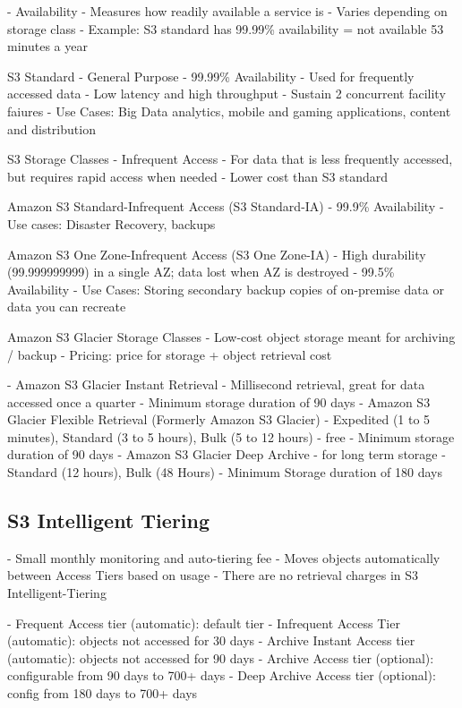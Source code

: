 \documentclass[11pt]{book}
\begin{document}
    - Availability
    - Measures how readily available a service is
    - Varies depending on storage class
    - Example: S3 standard has 99.99\% availability = not available 53 minutes a year

    S3 Standard - General Purpose
    - 99.99\% Availability
    - Used for frequently accessed data
    - Low latency and high throughput
    - Sustain 2 concurrent facility faiures
    - Use Cases: Big Data analytics, mobile and gaming applications, content and distribution

    S3 Storage Classes - Infrequent Access
    - For data that is less frequently accessed, but requires rapid access when needed
    - Lower cost than S3 standard

    Amazon S3 Standard-Infrequent Access (S3 Standard-IA)
    - 99.9\% Availability
    - Use cases: Disaster Recovery, backups

    Amazon S3 One Zone-Infrequent Access (S3 One Zone-IA)
    - High durability (99.999999999) in a single AZ; data lost when AZ is destroyed
    - 99.5\% Availability
    - Use Cases: Storing secondary backup copies of on-premise data or data you can recreate

    Amazon S3 Glacier Storage Classes
    - Low-cost object storage meant for archiving / backup
    - Pricing: price for storage + object retrieval cost

    - Amazon S3 Glacier Instant Retrieval
    - Millisecond retrieval, great for data accessed once a quarter
    - Minimum storage duration of 90 days
    - Amazon S3 Glacier Flexible Retrieval (Formerly Amazon S3 Glacier)
    - Expedited (1 to 5 minutes), Standard (3 to 5 hours), Bulk (5 to 12 hours) - free
    - Minimum storage duration of 90 days
    - Amazon S3 Glacier Deep Archive - for long term storage
    - Standard (12 hours), Bulk (48 Hours)
    - Minimum Storage duration of 180 days

    \subsection{S3 Intelligent Tiering}
    - Small monthly monitoring and auto-tiering fee
    - Moves objects automatically between Access Tiers based on usage
    - There are no retrieval charges in S3 Intelligent-Tiering

    - Frequent Access tier (automatic): default tier
    - Infrequent Access Tier (automatic): objects not accessed for 30 days
    - Archive Instant Access tier (automatic): objects not accessed for 90 days
    - Archive Access tier (optional): configurable from 90 days to 700+ days
    - Deep Archive Access tier (optional): config from 180 days to 700+ days
\end{document}
